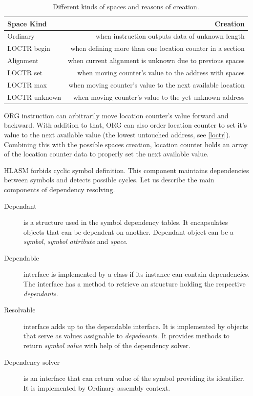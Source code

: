 \begin{table}
	\centering
	\begin{tabular}{lr}
		\textbf{Space Kind} &                                          \textbf{Creation} \\ \toprule
		Ordinary            &            when instruction outputs data of unknown length \\
		LOCTR begin         &  when defining more than one location counter in a section \\
		Alignment           &   when current alignment is unknown due to previous spaces \\
		LOCTR set           &     when moving counter's value to the address with spaces \\
		LOCTR max           & when moving counter's value to the next available location \\
		LOCTR unknown       &     when moving counter's value to the yet unknown address \\ \bottomrule
	\end{tabular}
	\caption{Different kinds of spaces and reasons of creation.}
	\label{tab06:space}
\end{table}

ORG instruction can arbitrarily move location counter's value forward and backward. With addition to that, ORG can also order location counter to set it's value to the next available value (the lowest untouched address, see \cref{loctr}). Combining this with the possible spaces creation, location counter holds an array of the location counter data to properly set the next available value.

\label{symbol_dependency_tables}
HLASM forbids cyclic symbol definition. This component maintains dependencies between symbols and detects possible cycles.
Let us describe the main components of dependency resolving.

\begin{description}
	\item[Dependant] is a structure used in the symbol dependency tables. It encapsulates objects that can be dependent on another. Dependant object can be a \emph{symbol}, \emph{symbol attribute} and \emph{space}.
	\item[Dependable] interface is implemented by a class if its instance can contain dependencies. The interface has a method to retrieve an structure holding the respective \emph{dependants}. 
	\item[Resolvable] interface adds up to the dependable interface. It is implemented by objects that serve as values assignable to \emph{depednants}. It provides methods to return \emph{symbol value} with help of the dependency solver. 
	\item[Dependency solver] is an interface that can return value of the symbol providing its identifier. It is implemented by Ordinary assembly context.
\end{description}

